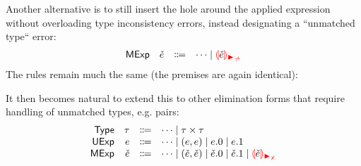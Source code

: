 \documentclass{article}
\begin{document}
Another alternative is to still insert the hole around the applied expression without overloading
type inconsistency errors, instead designating a ``unmatched type`` error:
%
\[\begin{array}{rrcl}
  \ECMName & \ECMV & \Coloneqq & \cdots \mid \ECInconMatchedArrow{\ECMV}
\end{array}\]
%
The rules remain much the same (the premises are again identical):
%
\begin{mathpar}

\end{mathpar}

It then becomes natural to extend this to other elimination forms that require handling of unmatched
types, e.g. pairs:
%
\[\begin{array}{rrcl}
  \TMName  & \TMV  & \Coloneqq & \cdots \mid \TPair{\TMV}{\TMV} \\
  \EMName  & \EMV  & \Coloneqq & \cdots
                               \mid \EPair{\EMV}{\EMV}
                               \mid \EProjL{\EMV} \mid \EProjR{\EMV} \\
  \ECMName & \ECMV & \Coloneqq & \cdots
                               \mid \ECPair{\ECMV}{\ECMV}
                               \mid \ECProjL{\ECMV} \mid \ECProjR{\ECMV}
                               \mid \ECInconMatchedPair{\ECMV}
\end{array}\]
\end{document}
